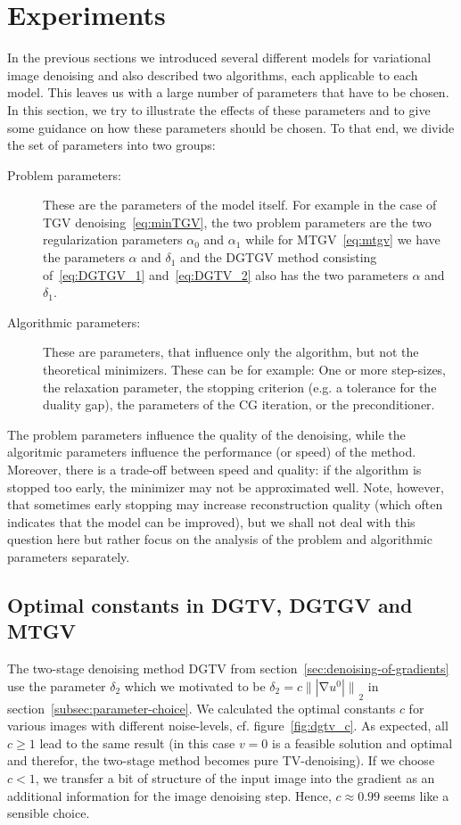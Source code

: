 \documentclass[twocolumn,envcountsame]{svjour3}
\newcommand{\norm}[2][]{{\|{#2}\|_{}}_{#1}}
\newcommand{\abs}[1]{|#1|}
\DeclareMathOperator{\grad}{\nabla}
\begin{document}
\section{Experiments}
\label{sec:experiments}

In the previous sections we introduced several different models for variational image denoising and also described two algorithms, each applicable to each model.
This leaves us with a large number of parameters that have to be chosen.
In this section, we try to illustrate the effects of these parameters and to give some guidance on how these parameters should be chosen.
To that end, we divide the set of parameters into two groups:
\begin{description}
\item[Problem parameters:] These are the parameters of the model itself. For example in the case of TGV denoising~\eqref{eq:minTGV}, the two problem parameters are the two regularization parameters $\alpha_{0}$ and $\alpha_{1}$ while for MTGV~\eqref{eq:mtgv} we have the parameters $\alpha$ and $\delta_{1}$ and the DGTGV method consisting of~\eqref{eq:DGTGV_1} and~\eqref{eq:DGTV_2} also has the two parameters  $\alpha$ and $\delta_{1}$.
\item[Algorithmic parameters:] These are parameters, that influence only the algorithm, but not the theoretical minimizers. These can be for example: One or more step-sizes, the relaxation parameter, the stopping criterion (e.g. a tolerance for the duality gap), the parameters of the CG iteration, or the preconditioner.
\end{description}
The problem parameters influence the quality of the denoising, while the algoritmic parameters influence the performance (or speed) of the method. Moreover, there is a trade-off between speed and quality: if the algorithm is stopped too early, the minimizer may not be approximated well. Note, however, that sometimes early stopping may increase reconstruction quality (which often indicates that the model can be improved), but we shall not  deal with this question here but rather focus on the analysis of the problem and algorithmic parameters separately.

\subsection{Optimal constants in DGTV, DGTGV and MTGV}

The two-stage denoising method DGTV from section~\ref{sec:denoising-of-gradients} use the parameter $\delta_{2}$ which we motivated to be $\delta_{2} = c\norm[2]{\abs{\grad u^{0}}}$ in section~\ref{subsec:parameter-choice}. We calculated the optimal constants $c$ for various images with different noise-levels, cf. figure~\ref{fig:dgtv_c}.
As expected,  all $c\geq 1$ lead to the same result (in this case $v=0$ is a feasible solution and optimal and therefor, the two-stage method becomes pure TV-denoising).
If we choose $c<1$, we transfer a bit of structure of the input image into the gradient as an additional information for the image denoising step. Hence, $c\approx 0.99$ seems like a sensible choice.
\end{document}
